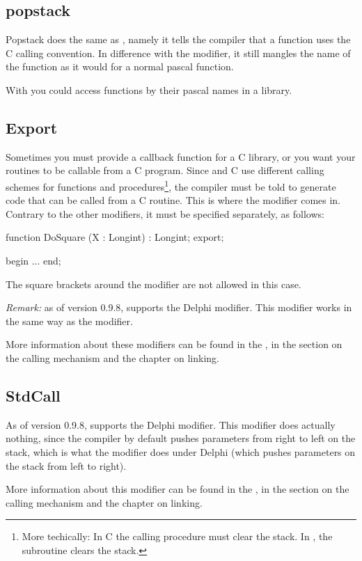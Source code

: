 \documentclass{report}
\begin{document}
\subsection{popstack}
\label{se:popstack}
Popstack does the same as , namely it tells the \fpc compiler
that a function uses the C calling convention. In difference with the
 modifier, it still mangles the name of the function as it would 
for a normal pascal function.

With  you could access functions by their pascal names in a
library.

\subsection{Export}
Sometimes you must provide a callback function for a C library, or you want
your routines to be callable from a C program. Since \fpc and C use
different calling schemes for functions and procedures\footnote{More
techically: In C the calling procedure must clear the stack. In \fpc, the
subroutine clears the stack.}, the compiler must be told to generate code
that can be called from a C routine. This is where the  modifier
comes in. Contrary to the other modifiers, it must be specified separately,
as follows:
\begin{listing}
function DoSquare (X : Longint) : Longint; export;

begin
...
end;
\end{listing}
The square brackets around the modifier are not allowed in this case.

{\em Remark:}
as of version 0.9.8, \fpc supports the Delphi  modifier. 
This modifier works in the same way as the  modifier.

More information about these modifiers can be found in the \progref, in the
section on the calling mechanism and the chapter on linking.

\subsection{StdCall}
As of version 0.9.8, \fpc supports the Delphi  modifier.
This modifier does actually nothing, since the \fpc compiler by default 
pushes parameters from right to left on the stack, which is what the 
modifier does under Delphi (which pushes parameters on the stack from left to 
right).

More information about this modifier can be found in the \progref, in the
section on the calling mechanism and the chapter on linking.
\end{document}
